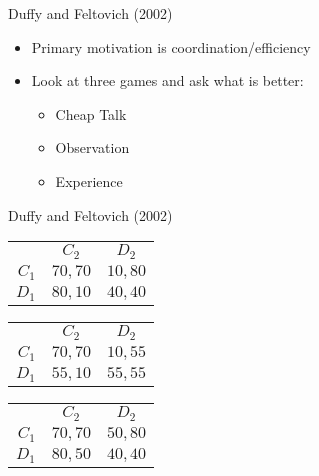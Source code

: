 \documentclass{beamer}
\begin{document}
\begin{frame}{Duffy and Feltovich (2002)}
\begin{itemize}
 \item Primary motivation is coordination/efficiency
 \item Look at three games and ask what is better:
	 \begin{itemize}
		 \item Cheap Talk
		 \item Observation
		 \item Experience
	\end{itemize}
\end{itemize}
\end{frame}


\begin{frame}{Duffy and Feltovich (2002)}

\begin{center}
\begin{tabular}{r|c|c|}
				\multicolumn{1}{r}{}& \multicolumn{1}{c}{$C_2$}  & \multicolumn{1}{c}{$D_2$} \\ \cline{2-3}
				$C_1$ &  $70,70$ & $10,80$ \\ \cline{2-3}
				$D_1$ &  $80,10$ & $40,40$ \\ \cline{2-3}
\end{tabular}
\begin{tabular}{r|c|c|}
				\multicolumn{1}{r}{}& \multicolumn{1}{c}{$C_2$}  & \multicolumn{1}{c}{$D_2$} \\ \cline{2-3}
				$C_1$ &  $70,70$ & $10, 55$ \\ \cline{2-3}
				$D_1$ &  $55,10$ & $55,55$ \\ \cline{2-3}
\end{tabular}
\begin{tabular}{r|c|c|}
				\multicolumn{1}{r}{}& \multicolumn{1}{c}{$C_2$}  & \multicolumn{1}{c}{$D_2$} \\ \cline{2-3}
				$C_1$ &  $70,70$ & $50,80$ \\ \cline{2-3}
				$D_1$ &  $80,50$ & $40,40$ \\ \cline{2-3}
\end{tabular}
\end{center}

\end{frame}
\end{document}
